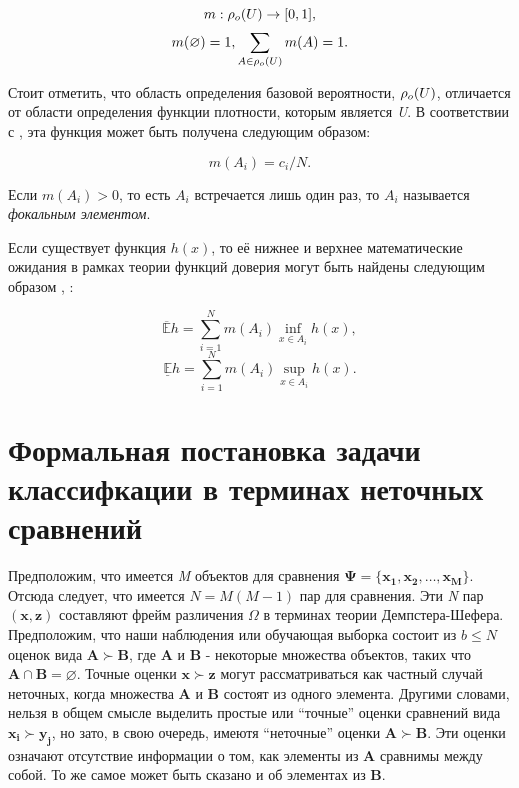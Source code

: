 \documentclass[12pt,a4paper,oneside]{article}
\begin{document}
\begin{multicols}{2}
\[
m : \mathrm{\rho}_o(U) \to [0,1],
\]
\[
m(\varnothing) = 1, \sum \limits_{A \in \mathrm{\rho}_o(U)} m(A) = 1.
\]

\par
Стоит отметить, что область определения базовой вероятности, \(\mathrm{\rho}_o(U)\), отличается от области определения функции плотности, которым является \emph{U}. 
В соответствии с , эта функция может быть получена следующим образом:

\[
m(A_i) = c_i / N.
\]

\par
Если \(m(A_i) > 0\), то есть \(A_i\) встречается лишь один раз, то \(A_i\) называется \emph{фокальным элементом}. 

\par
Если существует функция \(h(x)\), то её нижнее и верхнее математические ожидания в рамках теории функций доверия могут быть найдены следующим образом , :

\[
\mathbb{\overline{E}} h = \sum \limits_{i=1}^N m(A_i) \inf_{x \in A_i} h(x), \]
\[
\mathbb{\underline{E}} h = \sum \limits_{i=1}^N m(A_i) \sup_{x \in A_i} h(x).
\]


\vspace*{1em}
\chapter{Формальная постановка задачи классифкации в терминах неточных сравнений}

\par
Предположим, что имеется \emph{M} объектов для сравнения \(\mathbf{\Psi} = \{\mathbf{x_1}, \mathbf{x_2}, \dots, \mathbf{x_M}\}\). 
Отсюда следует, что имеется \(N = M(M - 1)\) пар для сравнения. 
Эти \emph{N} пар \((\mathbf{x}, \mathbf{z})\) составляют фрейм различения \(\Omega\) в терминах теории Демпстера-Шефера. 
Предположим, что наши наблюдения или обучающая выборка состоит из \(b \leq N\) оценок вида \(\mathbf{A} \succ \mathbf{B}\), где \(\mathbf{A}\) и \(\mathbf{B}\) - некоторые множества объектов, таких что \(\mathbf{A} \cap \mathbf{B} = \varnothing\).  
Точные оценки \(\mathbf{x} \succ \mathbf{z}\) могут рассматриваться как частный случай неточных, когда множества \(\mathbf{A}\) и \(\mathbf{B}\) состоят из одного элемента. 
Другими словами, нельзя в общем смысле выделить простые или ``точные'' оценки сравнений вида \(\mathbf{x_i} \succ \mathbf{y_j}\), но зато, в свою очередь, имеютя ``неточные'' оценки \(\mathbf{A} \succ \mathbf{B}\). 
Эти оценки означают отсутствие информации о том, как элементы из \(\mathbf{A}\) сравнимы между собой. 
То же самое может быть сказано и об элементах из \(\mathbf{B}\). 


\end{multicols}
\end{document}
